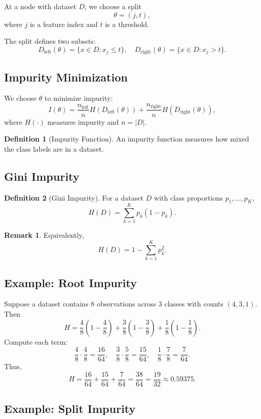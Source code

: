 \documentclass[12pt,oneside]{book}
\numberwithin{equation}{section}
\theoremstyle{definition}
\newtheorem{definition}{Definition}[section]
\newtheorem{remark}{Remark}[section]
\theoremstyle{plain}
\theoremstyle{remark}
\begin{document}
At a node with dataset $D$, we choose a split
\[
\theta=(j,t),
\]
where $j$ is a feature index and $t$ is a threshold.

The split defines two subsets:
\[
D_{\text{left}}(\theta)=\{x \in D : x_j \leq t\},
\quad
D_{\text{right}}(\theta)=\{x \in D : x_j > t\}.
\]

\subsection{Impurity Minimization}

We choose $\theta$ to minimize impurity:
\[
I(\theta)
=
\frac{n_{\text{left}}}{n}H(D_{\text{left}}(\theta))
+
\frac{n_{\text{right}}}{n}H(D_{\text{right}}(\theta)),
\]
where $H(\cdot)$ measures impurity and $n=|D|$.

\begin{definition}[Impurity Function]
An impurity function measures how mixed the class labels are in a dataset.
\end{definition}

\subsection{Gini Impurity}

\begin{definition}[Gini Impurity]
For a dataset $D$ with class proportions $p_1,\dots,p_K$,
\[
H(D)
=
\sum_{k=1}^K p_k(1-p_k).
\]
\end{definition}

\begin{remark}
Equivalently,
\[
H(D)=1-\sum_{k=1}^K p_k^2.
\]
\end{remark}

\subsection{Example: Root Impurity}

Suppose a dataset contains $8$ observations across $3$ classes with counts $(4,3,1)$. Then
\[
H
=
\frac{4}{8}\left(1-\frac{4}{8}\right)
+
\frac{3}{8}\left(1-\frac{3}{8}\right)
+
\frac{1}{8}\left(1-\frac{1}{8}\right).
\]
Compute each term:
\[
\frac{4}{8}\cdot\frac{4}{8}
=
\frac{16}{64},
\quad
\frac{3}{8}\cdot\frac{5}{8}
=
\frac{15}{64},
\quad
\frac{1}{8}\cdot\frac{7}{8}
=
\frac{7}{64}.
\]
Thus,
\[
H
=
\frac{16}{64}
+
\frac{15}{64}
+
\frac{7}{64}
=
\frac{38}{64}
=
\frac{19}{32}
\approx 0.59375.
\]

\subsection{Example: Split Impurity}
\end{document}
